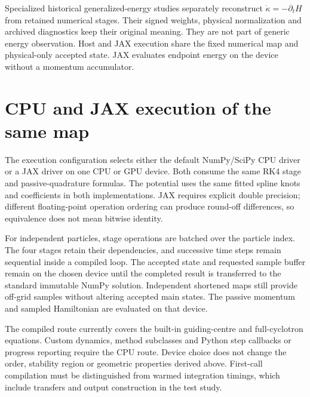 \documentclass[11pt,a4paper]{article}
\begin{document}
Specialized historical generalized-energy studies separately reconstruct
$\dot\kappa=-\partial_tH$ from retained numerical stages. Their signed weights,
physical normalization and archived diagnostics keep their original meaning.
They are not part of generic energy observation. Host and JAX execution share
the fixed numerical map and physical-only accepted state. JAX evaluates endpoint
energy on the device without a momentum accumulator.

\section{CPU and JAX execution of the same map}

The execution configuration selects either the default NumPy/SciPy CPU driver
or a JAX driver on one CPU or GPU device. Both consume the same RK4 stage and
passive-quadrature formulas. The potential uses the same fitted spline knots
and coefficients in both implementations. JAX requires explicit double
precision; different floating-point operation ordering can produce round-off
differences, so equivalence does not mean bitwise identity.

For independent particles, stage operations are batched over the particle
index. The four stages retain their dependencies, and successive time steps
remain sequential inside a compiled loop. The accepted state and requested
sample buffer remain on the chosen device until the completed result is
transferred to the standard immutable NumPy solution. Independent shortened
maps still provide off-grid samples without altering accepted main states.
The passive momentum and sampled Hamiltonian are evaluated on that device.

The compiled route currently covers the built-in guiding-centre and
full-cyclotron equations. Custom dynamics, method subclasses and Python
step callbacks or progress reporting require the CPU route. Device choice
does not change the order, stability region or geometric properties derived
above. First-call compilation must be distinguished from warmed integration
timings, which include transfers and output construction in the test study.
\end{document}
